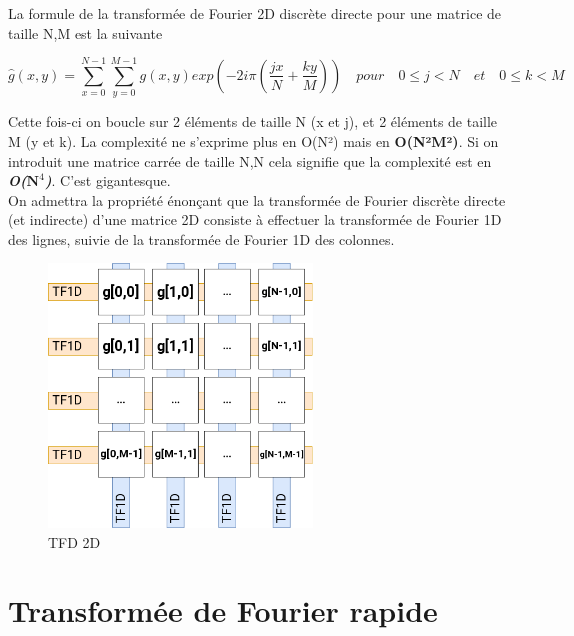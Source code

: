 \documentclass{article}
\begin{document}
La formule de la transformée de Fourier 2D discrète directe pour une matrice de taille N,M est la suivante

\begin{equation}
	\widehat{g}(x,y) = \sum_{x = 0}^{N-1}\sum_{y = 0}^{M-1}g(x,y) exp(-2i\pi(\frac{jx}{N}+\frac{ky}{M})) \quad pour \quad 0 \leq j < N\quad et \quad 0 \leq k < M
\end{equation}

Cette fois-ci on boucle sur 2 éléments de taille N (x et j), et 2 éléments de taille M (y et k). La complexité ne s'exprime plus en O(N²) mais en \textbf{O(N²M²)}. Si on introduit une matrice carrée de taille N,N cela signifie que la complexité est en \textbf{\textit{O($\textbf{N}^4$)}}. C'est gigantesque.\\

\noindent On admettra la propriété énonçant que la transformée de Fourier discrète directe (et indirecte) d'une matrice 2D consiste à effectuer la transformée de Fourier 1D des lignes, suivie de la transformée de Fourier 1D des colonnes.

\begin{figure}[!htb]
	\centering
	\includegraphics[height=7cm]{./assets/TFD2D.png}
	\caption{TFD 2D}
	\label{fig:TFD2D}
\end{figure}



\section{Transformée de Fourier rapide}
\end{document}
